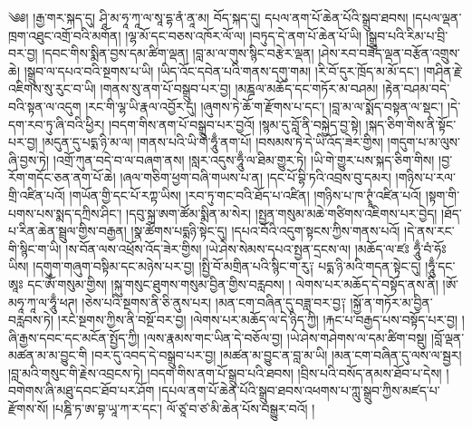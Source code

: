 ༄༅། །རྒྱ་གར་སྐད་དུ། ཤཱི་མ་ཧཱ་ཀཱ་ལ་སཱ་དྷ་ནཾ་ནཱ་མ། བོད་སྐད་དུ། དཔལ་ནག་པོ་ཆེན་པོའི་སྒྲུབ་ཐབས། །དཔལ་ལྡན་ཁྲག་འཐུང་འགྲོ་བའི་མགོན། །ལྷ་མོ་དང་བཅས་འཁོར་ལོ་ལ། །བཏུད་དེ་ནག་པོ་ཆེན་པོ་ཡི། །སྒྲུབ་པའི་རིམ་པ་བྲི་བར་བྱ། །དབང་གིས་སྨིན་བྱས་དམ་ཚིག་ལྡན། །བླ་མ་ལ་གུས་སྙིང་བརྩེར་ལྡན། །ཤེས་རབ་བཟོད་ལྡན་བརྩོན་འགྲུས་ཆེ། །སྒྲུབ་ལ་དཔའ་བའི་སྔགས་པ་ཡི། །ཡིད་འོང་དབེན་པའི་གནས་དགུ་གམ། །རི་བོ་དུར་ཁྲོད་མ་མོ་དང་། །གཤིན་རྗེ་འཇིགས་སུ་རུང་བ་ཡི། །གནས་སུ་ནག་པོ་བསྒྲུབ་པར་བྱ། །མཎྜལ་མཆོད་དང་གཏོར་མ་བཤམ། །རྟེན་བཤམ་བདེ་བའི་སྟན་ལ་འདུག །རང་གི་ལྷ་ཡི་རྣལ་འབྱོར་དུ། །ཞུགས་ཏེ་ཆོ་ག་རྫོགས་པ་དང་། །བླ་མ་ལ་སྨོད་བསྟན་ལ་སྡང་། །དེ་དག་རབ་ཏུ་ཞི་བའི་ཕྱིར། །བདག་གིས་ནག་པོ་བསྒྲུབ་པར་བྱའོ། །སྙམ་དུ་བློ་ནི་བསྐྱེད་བྱ་སྟེ། །སྐད་ཅིག་གིས་ནི་སྟོང་པར་བྱ། །མདུན་དུ་པདྨ་ཉི་མ་ལ། །གནས་པའི་ཡི་གེ་ཧཱུྃ་ནག་པོ། །བསམས་ཏེ་དེ་ཡི་འོད་ཟེར་གྱིས། །གདུག་པ་མ་ལུས་ཞི་བྱས་ཏེ། །འགྲོ་ཀུན་བདེ་བ་ལ་བཞག་ནས། །སླར་འདུས་ཧཱུྃ་ལ་ཐིམ་གྱུར་ཏེ། །ཡི་གེ་གྱུར་པས་སྐད་ཅིག་གིས། །བྱ་རོག་གདོང་ཅན་ནག་པོ་ཆེ། །ཞལ་གཅིག་ཕྱག་བཞི་གཡས་པ་ན། །དང་པོ་བྷི་ཏའི་འབྲས་བུ་དམར། །གཉིས་པ་རལ་གྲི་འཛིན་པའོ། །གཡོན་གྱི་དང་པོ་རཀྟ་ཡིས། །རབ་ཏུ་གང་བའི་ཐོད་པ་འཛིན། །གཉིས་པ་ཁ་ཊྭཱཾ་འཛིན་པའོ། །སྟག་གི་པགས་པས་སྨད་དཀྲིས་ཤིང་། །དབུ་སྐྲ་ཨག་ཚོམ་སྨིན་མ་སེར། །སྤྱན་གསུམ་མཆེ་གཙིགས་འཇིགས་པར་བྱེད། །ཐོད་པ་རིན་ཆེན་སྦྲུལ་གྱིས་བརྒྱན། །སྣ་ཚོགས་པདྨཉི་སྟེང་དུ། །དཔའ་བོའི་འདུག་སྟངས་ཀྱིས་གནས་པའོ། །དེ་ནས་རང་གི་སྙིང་ག་ཡི། །ས་བོན་ལས་འཕྲོས་འོད་ཟེར་གྱིས། །ཡེ་ཤེས་སེམས་དཔའ་སྤྱན་དྲངས་ལ། །མཆོད་ལ་ཛཿ ཧཱུྃ་བཾ་ཧོཿ ཡིས། །དགུག་གཞུག་བསྟིམ་དང་མཉེས་པར་བྱ། །སྤྱི་བོ་མགྲིན་པའི་སྙིང་ག་རུ༑ པདྨ་ཉི་མའི་གདན་སྟེང་དུ། །ཧཱུྃ་དང་ཨཱཿ དང་ཨོཾ་གསུམ་གྱིས། །སྐུ་གསུང་ཐུགས་གསུམ་བྱིན་གྱིས་བརླབས། །
ལེགས་པར་མཆོད་དེ་བསྟོད་ནས་ནི། །ཨོ་མཧཱ་ཀཱ་ལ་ཧཱུྃ་ཕཊ྄། །ཅེས་པའི་སྔགས་ནི་ཅི་ནུས་པར། །མན་ངག་བཞིན་དུ་བཟླ་བར་བྱ༑ །སྐྱོ་ན་གཏོར་མ་བྱིན་བརླབས་ཏེ། །རང་སྔགས་ཀྱིས་ནི་བསྔོ་བར་བྱ། །ལེགས་པར་མཆོད་ལ་དེ་ཉིད་ཀྱི། །རྐང་པ་བརྒྱད་པས་བསྟོད་པར་བྱ། །ཞི་རྒྱས་དབང་དང་མངོན་སྤྱོད་ཀྱི། །ལས་རྣམས་གང་ཡིན་དེ་བཅོལ་བྱ། །ཡེ་ཤེས་གཤེགས་ལ་དམ་ཚིག་བསྡུ། །བློ་ལྡན་མཚན་མ་མ་བྱུང་གི །བར་དུ་འབད་དེ་བསྒྲུབ་པར་བྱ། །མཚན་མ་བྱུང་ན་བླ་མ་ཡི། །མན་ངག་བཞིན་དུ་ལས་ལ་སྦྱར། །བླ་མའི་གསུང་གི་རྗེས་འབྲངས་ཏེ། །བདག་གིས་ནག་པོ་སྒྲུབ་པའི་ཐབས། །བྲིས་པའི་བསོད་ནམས་ཐོབ་པ་དེས། །བགེགས་ཞི་མཐུ་དབང་ཐོབ་པར་ཤོག །དཔལ་ནག་པོ་ཆེན་པོའི་སྒྲུབ་ཐབས་འཕགས་པ་ཀླུ་སྒྲུབ་ཀྱིས་མཛད་པ་རྫོགས་སོ། །པཎྜི་ཏ་ཨ་བྷ་ཡཱ་ཀ་ར་དང་། ལོ་ཙཱ་བ་ཙ་མི་ཆེན་པོས་བསྒྱུར་བའོ། །